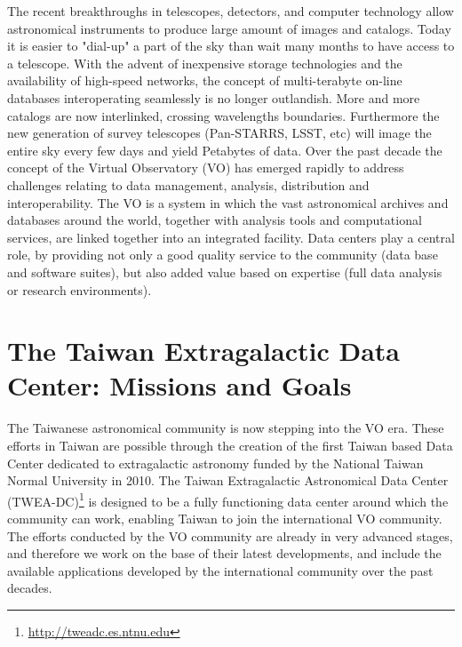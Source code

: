 The recent breakthroughs in telescopes, detectors, and computer technology allow astronomical instruments to produce large amount of images and catalogs. Today it is easier to "dial-up" a part of the sky than wait many months to have access to a telescope. With the advent of inexpensive storage technologies and the availability of high-speed networks, the concept of multi-terabyte on-line databases interoperating seamlessly is no longer outlandish. More and more catalogs are now interlinked, crossing wavelengths boundaries. Furthermore the new generation of survey telescopes (Pan-STARRS, LSST, etc) will image the entire sky every few days and yield Petabytes of data.
Over the past decade the concept of the Virtual Observatory (VO) has emerged rapidly to address challenges relating to data management, analysis, distribution and interoperability. The VO is a system in which the vast astronomical archives and databases around the world, together with analysis tools and computational services, are linked together into an integrated facility. Data centers play a central role, by providing not only a good quality service to the community (data base and software suites), but also added value based on expertise (full data analysis or research environments).

\section{The Taiwan Extragalactic Data Center: Missions and Goals}

The Taiwanese astronomical community is now stepping into the VO era. These efforts in Taiwan are possible through the creation of the first Taiwan based Data Center dedicated to extragalactic astronomy funded by the National Taiwan Normal University in 2010. The Taiwan Extragalactic Astronomical Data Center (TWEA-DC)\footnote{ \url{http://tweadc.es.ntnu.edu}} is designed to be a fully functioning data center around which the community can work, enabling Taiwan to join the international VO community. The efforts conducted by the VO community are already in very advanced stages, and therefore we work on the base of their latest developments, and include the available applications developed by the international community over the past decades. \\

